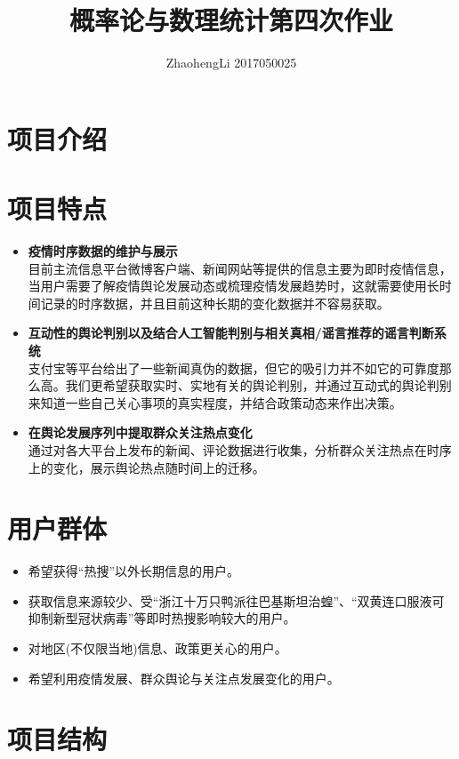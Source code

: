 \documentclass{article}
\title{概率论与数理统计第四次作业}
\author{ZhaohengLi 2017050025}
\begin{document}
\maketitle

\section{项目介绍}
\section{项目特点}
\begin{itemize}
	\item{\textbf{疫情时序数据的维护与展示}\\
	目前主流信息平台微博客户端、新闻网站等提供的信息主要为即时疫情信息，当用户需要了解疫情舆论发展动态或梳理疫情发展趋势时，这就需要使用长时间记录的时序数据，并且目前这种长期的变化数据并不容易获取。}
	\item{\textbf{互动性的舆论判别以及结合人工智能判别与相关真相/谣言推荐的谣言判断系统}\\
	支付宝等平台给出了一些新闻真伪的数据，但它的吸引力并不如它的可靠度那么高。我们更希望获取实时、实地有关的舆论判别，并通过互动式的舆论判别来知道一些自己关心事项的真实程度，并结合政策动态来作出决策。}
	\item{\textbf{在舆论发展序列中提取群众关注热点变化}}\\
	通过对各大平台上发布的新闻、评论数据进行收集，分析群众关注热点在时序上的变化，展示舆论热点随时间上的迁移。



\end{itemize}

\section{用户群体}
\begin{itemize}
	\item{希望获得“热搜”以外长期信息的用户。}
	\item{获取信息来源较少、受“浙江十万只鸭派往巴基斯坦治蝗”、“双黄连口服液可抑制新型冠状病毒”等即时热搜影响较大的用户。}
	\item{对地区(不仅限当地)信息、政策更关心的用户。}
	\item{希望利用疫情发展、群众舆论与关注点发展变化的用户。}
\end{itemize}

\section{项目结构}
\newpage
\end{document}
